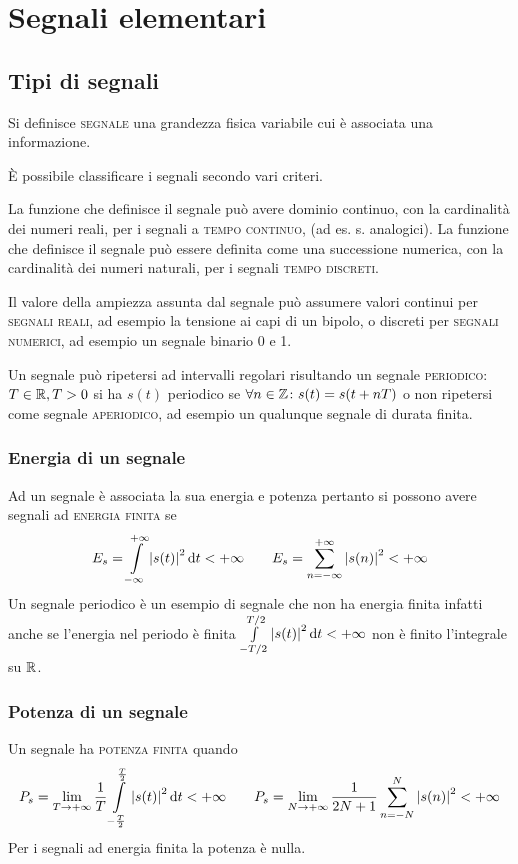 \chapter{Segnali elementari}
\section{Tipi di segnali}
Si definisce \textsc{segnale} una grandezza fisica variabile cui è associata una informazione.

\`{E} possibile classificare i segnali secondo vari criteri.

La funzione che definisce il segnale può avere dominio continuo, con la cardinalità dei numeri reali, per i segnali a \textsc{tempo continuo}, (ad es. s. analogici). La funzione che definisce il segnale può essere definita come una successione numerica, con la cardinalità dei numeri naturali, per i segnali \textsc{tempo discreti}.

Il valore della ampiezza assunta dal segnale può assumere valori continui per \textsc{segnali reali}, ad esempio la tensione ai capi di un bipolo, o discreti per \textsc{segnali numerici}, ad esempio un segnale binario 0 e 1.

Un segnale può ripetersi ad intervalli regolari risultando un segnale \textsc{periodico}: $T\in\mathbb{R}, T>0$ si ha $s(t)$ periodico se $\forall n\in\mathbb{Z}\colon s(t)=s(t+n T)$
o non ripetersi come segnale \textsc{aperiodico}, ad esempio un qualunque segnale di durata finita.

\subsection{Energia di un segnale}
Ad un segnale è associata la sua energia e potenza pertanto si possono avere segnali ad \textsc{energia finita} se \begin{equation}\label{eq:segnale_energia}E_s=\int\limits_{-\infty}^{+\infty}{\left|{s(t)}\right|^2}{\,\mathop{}\!\mathrm{d}{t}}<+\infty \qquad E_s=\sum_{n=-\infty}^{+\infty}\left|{s(n)}\right|^2 <+\infty\end{equation}
Un segnale periodico è un esempio di segnale che non ha energia finita infatti anche se l'energia nel periodo è finita $\int\limits_{-T/2}^{T/2}{\left|{s(t)}\right|^2}{\,\mathop{}\!\mathrm{d}{t}}<+\infty$ non è finito l'integrale su $\mathbb{R}$.

\subsection{Potenza di un segnale}
Un segnale ha \textsc{potenza finita} quando \begin{equation}\label{eq:segnale_potenza}P_s=\lim\limits_{T\to+\infty}{\frac{1}{T}\int\limits_{-\frac{T}{2}}^{\frac{T}{2}}{\left|{s(t)}\right|^2}{\,\mathop{}\!\mathrm{d}{t}}<+\infty}   \qquad  P_s=\lim\limits_{N\to+\infty}{\frac{1}{2N+1}\sum_{n=-N}^{N}{\left|{s(n)}\right|^2}<+\infty}\end{equation}
Per i segnali ad energia finita la potenza è nulla.

